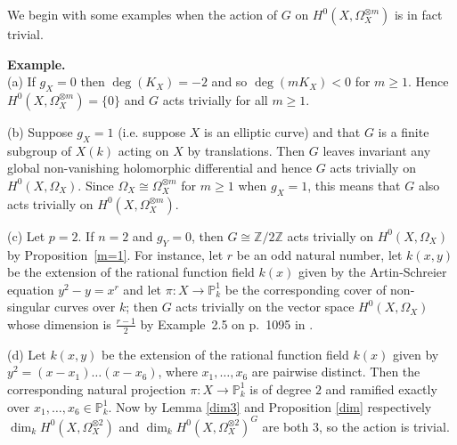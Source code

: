 \documentclass[11pt]{article} %
\theoremstyle{remark}\newtheorem*{rem}{Remark}
\newcommand{\PP}{{\mathbb P}}
\newcommand{\ZZ}{{\mathbb Z}}
\begin{document}
  We begin with some examples when the action of $G$ on $H^0(X, \Omega_X^{\otimes m})$ is in fact trivial.

{\bf Example.}\\
  (a) If $g_X = 0$ then $\deg(K_X)=-2$ and so $\deg(mK_X)<0$ for $m\geq1$. 
  Hence  $H^0(X,\Omega_X^{\otimes m}) = \{0\}$ and $G$ acts trivially for all $m\geq 1$.

  
  (b) Suppose $g_X =1 $ (i.e. suppose $X$ is an elliptic curve) and that $G$ is a finite subgroup of $X(k)$ acting on $X$ by translations.
  Then $G$ leaves invariant any global non-vanishing holomorphic differential and hence $G$ acts trivially on $H^0(X,\Omega_X)$.
  Since $\Omega_X\cong \Omega_X^{\otimes m}$ for $m\geq1$ when $g_X=1$, this means that $G$ also acts trivially on  $H^0(X,\Omega_X^{\otimes m})$.


  (c) Let $p=2$. 
  If $n=2$ and $g_Y =0$, then $G \cong \ZZ/2\ZZ$ acts trivially on $H^0(X, \Omega_X)$ by Proposition~\ref{m=1}.
  For instance, let $r$ be an odd natural number, let $k(x,y)$ be the extension of the rational function field $k(x)$ given by the Artin-Schreier equation $y^2-y = x^r$ and let $\pi: X \rightarrow \PP^1_k$ be the corresponding cover of non-singular curves over $k$; 
  then $G$ acts trivially on the vector space $H^0(X,\Omega_X)$ whose dimension is $\frac{r-1}{2}$ by Example~2.5 on p.~1095 in \cite{galoisstruc}.

  (d) Let $k(x,y)$ be the extension of the rational function field $k(x)$ given by $y^2=(x-x_1)\ldots (x-x_6)$, where $x_1, \ldots , x_6$ are pairwise distinct.
      Then the corresponding natural projection $\pi:X\rightarrow \mathbb{P}_k^1$ is of degree $2$ and ramified exactly over $x_1,\ldots , x_6\in \mathbb{P}_k^1$.
      Now by Lemma \ref{dim3} and Proposition \ref{dim} respectively $\dim_kH^0(X,\Omega_X^{\otimes 2})$ and $\dim_kH^0(X,\Omega_X^{\otimes 2})^G$ are both $3$, so the action is trivial.\\
\end{document}

